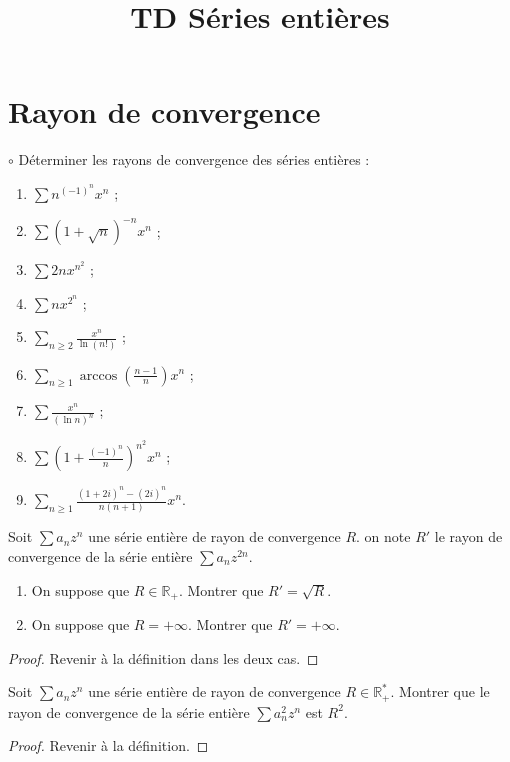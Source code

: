 \documentclass[french,a4paper]{article}
\title{TD Séries entières}
\newcommand{\R}{\mathbb{R}}
\newcommand{\st}{^*}
\theoremstyle{plain}
\theoremstyle{definition}
\theoremstyle{remark}
\begin{document}
\maketitle

\section{Rayon de convergence}

\begin{ex}[Moulin.SE.01]{$\circ$}
	Déterminer les rayons de convergence des séries entières :
	\begin{enumerate}
		\item $\displaystyle\sum n^{(-1)^n}x^n$ ;
		\item $\displaystyle\sum (1+\sqrt{n})^{-n}x^n$ ;
		\item $\displaystyle\sum 2nx^{n^2}$ ;
		\item $\displaystyle\sum nx^{2^n}$ ;
		\item $\displaystyle\sum_{n\geqslant 2} \frac{x^n}{\ln(n!)}$ ;
		\item $\displaystyle\sum_{n\geqslant 1} \arccos\left(\frac{n-1}{n}\right)x^n$ ;
		\item $\displaystyle\sum \frac{x^n}{(\ln n)^n}$ ;
		\item $\displaystyle\sum \left(1+\frac{(-1)^n}{n}\right)^{n^2}x^n$ ;
		\item $\displaystyle\sum_{n\geqslant 1} \frac{(1+2i)^n-(2i)^n}{n(n+1)}x^n$.
	\end{enumerate}
\end{ex}

\begin{ex}[Moulin.SE.02]{}
	Soit $\sum a_nz^n$ une série entière de rayon de convergence $R$. on note $R'$ le rayon de convergence de la série entière $\sum a_nz^{2n}$.
	\begin{enumerate}
		\item On suppose que $R\in\R_+$. Montrer que $R'=\sqrt{R}$.
		\item On suppose que $R=+\infty$. Montrer que $R'=+\infty$.
	\end{enumerate}
\end{ex}
\begin{proof}
	Revenir à la définition dans les deux cas.
\end{proof}

\begin{ex}[Moulin.SE.03]{}
	Soit $\sum a_nz^n$ une série entière de rayon de convergence $R\in\R_+\st$. Montrer que le rayon de convergence de la série entière $\sum a_n^2z^n$ est $R^2$.
\end{ex}
\begin{proof}
	Revenir à la définition.
\end{proof}
\end{document}
